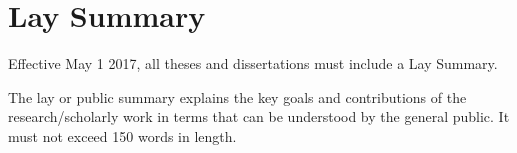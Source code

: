 
\chapter{Lay Summary}

Effective May 1 2017, all theses and dissertations must include a Lay Summary.

The lay or public summary explains the key goals and contributions of the
research/scholarly work in terms that can be understood by the general public. It must not exceed 150 words in length.
